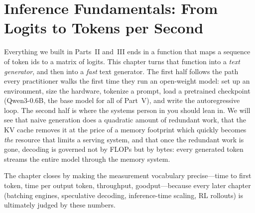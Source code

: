 \chapter{Inference Fundamentals: From Logits to Tokens per Second}\label{ch:inference}

Everything we built in Parts~II and~III ends in a function that maps a sequence of token ids
to a matrix of logits. This chapter turns that function into a \emph{text generator}, and then
into a \emph{fast} text generator. The first half follows the path every practitioner walks the
first time they run an open-weight model: set up an environment, size the hardware, tokenize a
prompt, load a pretrained checkpoint (Qwen3-0.6B, the base model for all of Part~V), and write
the autoregressive loop. The second half is where the systems person in you should lean in.
We will see that naive generation does a quadratic amount of redundant work, that the KV cache
removes it at the price of a memory footprint which quickly becomes \emph{the} resource that
limits a serving system, and that once the redundant work is gone, decoding is governed not by
FLOPs but by bytes: every generated token streams the entire model through the memory system.

The chapter closes by making the measurement vocabulary precise---time to first token, time per
output token, throughput, goodput---because every later chapter (batching engines, speculative
decoding, inference-time scaling, RL rollouts) is ultimately judged by these numbers.

